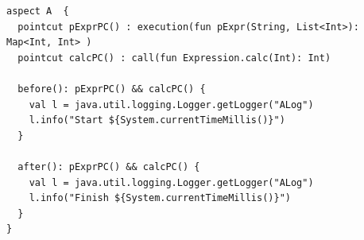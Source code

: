 \documentclass[conference]{IEEEtran}
\begin{document}


\begin{lstlisting}[label=lst:log_aspect_ex,
    caption={Пример аспекта, используемого для логирования вызова метода calc}]
aspect A  {
  pointcut pExprPC() : execution(fun pExpr(String, List<Int>): Map<Int, Int> )
  pointcut calcPC() : call(fun Expression.calc(Int): Int)

  before(): pExprPC() && calcPC() {
    val l = java.util.logging.Logger.getLogger("ALog")
    l.info("Start ${System.currentTimeMillis()}")
  }

  after(): pExprPC() && calcPC() {
    val l = java.util.logging.Logger.getLogger("ALog")
    l.info("Finish ${System.currentTimeMillis()}")
  }
}
\end{lstlisting}
\end{document}
